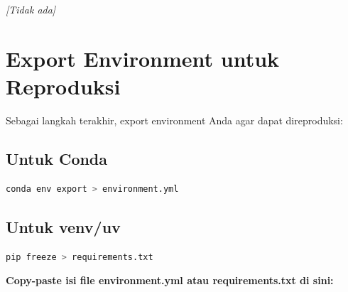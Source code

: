 \documentclass[11pt,a4paper]{article}
\begin{document}
\textit{[Tidak ada]}

\section{Export Environment untuk Reproduksi}
Sebagai langkah terakhir, export environment Anda agar dapat direproduksi:

\subsection{Untuk Conda}
\begin{lstlisting}[language=bash, caption=Export conda environment]
conda env export > environment.yml
\end{lstlisting}

\subsection{Untuk venv/uv}
\begin{lstlisting}[language=bash, caption=Export pip requirements]
pip freeze > requirements.txt
\end{lstlisting}

\textbf{Copy-paste isi file environment.yml atau requirements.txt di sini:}
\end{document}
